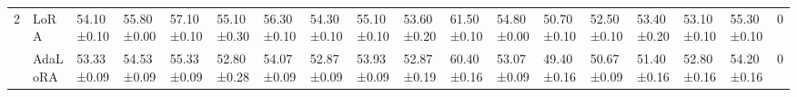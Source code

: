\begin{table*}[]
\begin{scriptsize}
{\begin{tabular}{c|l|l|l|l|l|l|l|l|l|l|l|l|l|l|l|l|c}
\multirow{5}{*}{2}  & LoRA                                   & 54.10±0.10                        & 55.80±0.00                        & 57.10±0.10                        & 55.10±0.30                        & 56.30±0.10                        & 54.30±0.10                        & 55.10±0.10                        & 53.60±0.20                       & 61.50±0.10                        & 54.80±0.00                        & 50.70±0.10                        & 52.50±0.10                        & 53.40±0.20                       & 53.10±0.10                        & 55.30±0.10                        & 0             \\ %
                    & AdaLoRA                              & 53.33±0.09                       & 54.53±0.09                       & 55.33±0.09                       & 52.80±0.28                        & 54.07±0.09                       & 52.87±0.09                       & 53.93±0.09                       & 52.87±0.19                       & 60.40±0.16                        & 53.07±0.09                       & 49.40±0.16                        & 50.67±0.09                       & 51.40±0.16                        & 52.80±0.16                        & 54.20±0.16                        & 0             \\ %

\end{tabular}}
\end{scriptsize}
\end{table*}
